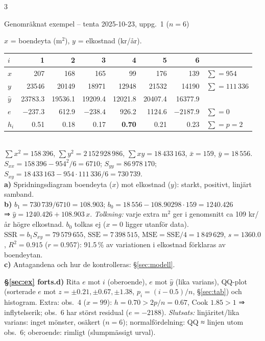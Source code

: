\documentclass[8pt]{extarticle}
\makeatletter
\newcounter{sect}
\newcommand{\sect}[3][hd]{\par\vspace{1.5pt}\refstepcounter{sect}\noindent
  {\setlength{\fboxsep}{1.8pt}\colorbox{#1}{\parbox{\dimexpr\linewidth-2\fboxsep}{\color{white}\sffamily\bfseries
  \strut\thesect\enspace #2}}}\label{#3}\par\nobreak\vspace{0.8pt}\@afterheading}
\newcommand{\sidbyte}{\columnbreak}%
\newcommand{\sub}[1]{{\color{hd}\sffamily\bfseries #1}\enspace}
\newcommand{\SSE}{\mathrm{SSE}}
\newcommand{\SSR}{\mathrm{SSR}}
\newcommand{\MSE}{\mathrm{MSE}}
\makeatother
\begin{document}
\begin{multicols*}{3}
\sect[cRakna]{Genomräknat exempel – tenta 2025-10-23, uppg.\ 1 ($n=6$)}{sec:ex}
$x$ = boendeyta (m$^2$), $y$ = elkostnad (kr/år).\\
{\footnotesize
\begin{tabular}{@{}l|rrrrrr|l@{}}
$i$ & 1 & 2 & 3 & 4 & 5 & 6 & \\\hline
$x$ & 207 & 168 & 165 & 99 & 176 & 139 & $\sum=954$\\
$y$ & 23546 & 20149 & 18971 & 12948 & 21532 & 14190 & $\sum=111\,336$\\
$\hat y$ & 23783.3 & 19536.1 & 19209.4 & 12021.8 & 20407.4 & 16377.9 & \\
$e$ & $-237.3$ & 612.9 & $-238.4$ & 926.2 & 1124.6 & $-2187.9$ & $\sum=0$\\
$h_i$ & 0.51 & 0.18 & 0.17 & \textbf{0.70} & 0.21 & 0.23 & $\sum=p=2$
\end{tabular}}\\[1pt]
$\sum x^2=158\,396$, $\sum y^2=2\,152\,928\,986$, $\sum xy=18\,433\,163$, $\bar x=159$, $\bar y=18\,556$.\\
$S_{xx}=158\,396-954^2/6=6710$;\; $S_{yy}=86\,978\,170$;\; $S_{xy}=18\,433\,163-954\cdot111\,336/6=730\,739$.\\
\textbf{a)} Spridningsdiagram boendeyta ($x$) mot elkostnad ($y$): starkt, positivt, linjärt samband.\\
\textbf{b)} $b_1=730\,739/6710=108.903$;\; $b_0=18\,556-108.90298\cdot159=1240.426$\\
⇒ $\hat y=1240.426+108.903\,x$. \emph{Tolkning:} varje extra m$^2$ ger i genomsnitt ca 109 kr/år högre elkostnad. $b_0$ tolkas ej ($x=0$ ligger utanför data).
$\SSR=b_1S_{xy}=79\,579\,655$, $\SSE=7\,398\,515$, $\MSE=\SSE/4=1\,849\,629$, $s=1360.0$, $R^2=0.915$ ($r=0.957$): 91.5\,\% av variationen i elkostnad förklaras av boendeytan.\\
\textbf{c)} Antagandena och hur de kontrolleras: §\ref{sec:modell}.\par\sidbyte%
\sub{§\ref{sec:ex} forts.}\textbf{d)} Rita $e$ mot $i$ (oberoende), $e$ mot $\hat y$ (lika varians), QQ-plot (sorterade $e$ mot $z=\pm0.21,\pm0.67,\pm1.38$, $p_i=(i-0.5)/n$, §\ref{sec:tab}) och histogram. Extra: obs.\ 4 ($x=99$): $h=0.70>2p/n=0.67$, Cook $1.85>1$ ⇒ inflytelserik; obs.\ 6 har störst residual ($e=-2188$). \emph{Slutsats:} linjäritet/lika varians: inget mönster, osäkert ($n=6$); normalfördelning: QQ ≈ linjen utom obs.\ 6; oberoende: rimligt (slumpmässigt urval).\\

\end{multicols*}
\end{document}
